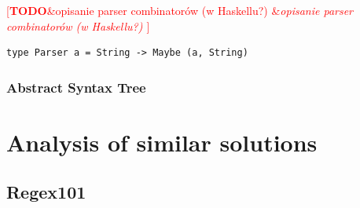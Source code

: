 \documentclass[english,engineering]{wizthesis}
\newcommand{\todo}[1]{%
  \textcolor{red}{[\textbf{TODO}\ifx&#1&{}\else{ }\fi\emph{#1}]}%
}
\begin{document}
\todo{opisanie parser combinatorów (w Haskellu?) \cite{swierstra-2009}
\cite{leijen-2001} \cite{fokker-1995}}

\begin{verbatim}
type Parser a = String -> Maybe (a, String)
\end{verbatim}




\subsection{Abstract Syntax Tree} \label{sbs:ast}

\chapter{Analysis of similar solutions}

\section*{Regex101}
\end{document}
